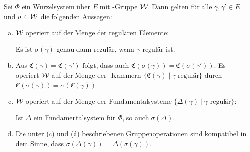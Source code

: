 \begin{prop}
  \label{prop:groupOp}
  Sei $\Phi$ ein Wurzelsystem über $E$ mit \weyl\hyp{}Gruppe $\mathcal{W}$.
  Dann gelten für alle $\gamma, \gamma' \in E$ und $\sigma \in \mathcal{W}$ die folgenden Aussagen:
  \begin{enumerate}[(a)]
    \item $\mathcal{W}$ operiert auf der Menge der regulären Elemente: 
      \begin{addmargin}[2em]{2em}
        Es ist $\sigma(\gamma)$ genau dann regulär, wenn $\gamma$ regulär ist.
      \end{addmargin}
      
    \item Aus $\mathfrak{C}(\gamma) = \mathfrak{C}(\gamma')$ folgt, dass auch $\mathfrak{C}(\sigma(\gamma)) = \mathfrak{C}(\sigma(\gamma'))$. 
      Es operiert $\mathcal{W}$ auf der Menge der \weyl\hyp{}Kammern $\{\mathfrak{C}(\gamma) \mid \gamma \text{ regulär}\}$ durch $\mathfrak{C}(\sigma(\gamma)) = \sigma(\mathfrak{C}(\gamma))$.

    \item $\mathcal{W}$ operiert auf der Menge der Fundamentalsysteme $\{\Delta(\gamma) \mid \gamma \text{ regulär}\}$: 
      \begin{addmargin}[2em]{2em}
        Ist $\Delta$ ein Fundamentalsystem für $\Phi$, so auch $\sigma(\Delta)$. 
      \end{addmargin}

    \item Die unter (c) und (d) beschriebenen Gruppenoperationen sind kompatibel in dem Sinne, dass 
      $\sigma(\Delta(\gamma)) = \Delta(\sigma(\gamma))$.
  \end{enumerate}
\end{prop}

